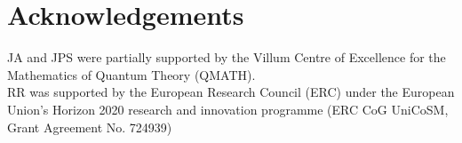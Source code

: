 \documentclass[a4paper,11pt]{article}
\numberwithin{equation}{section}
\begin{document}
			\section{Acknowledgements}
			JA and JPS were partially supported by the Villum Centre of Excellence for the Mathematics of Quantum Theory (QMATH).\\
			RR was supported by the European Research Council (ERC) under the European Union’s Horizon 2020 research and innovation programme (ERC CoG UniCoSM, Grant Agreement No. 724939)
	
	
	
\end{document}
